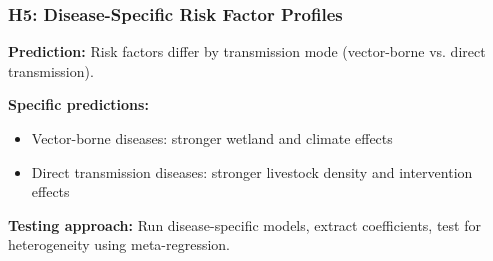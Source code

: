 \documentclass[11pt,a4paper]{article}
\begin{document}
\subsubsection{H5: Disease-Specific Risk Factor Profiles}

\textbf{Prediction:} Risk factors differ by transmission mode (vector-borne vs. direct transmission).

\textbf{Specific predictions:}
\begin{itemize}
    \item Vector-borne diseases: stronger wetland and climate effects
    \item Direct transmission diseases: stronger livestock density and intervention effects
\end{itemize}

\textbf{Testing approach:} Run disease-specific models, extract coefficients, test for heterogeneity using meta-regression.
\end{document}
